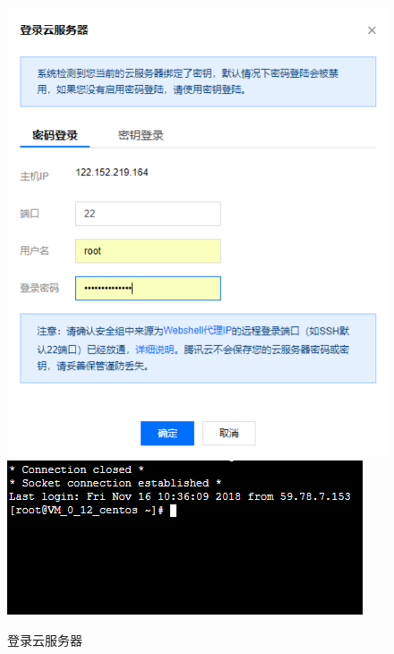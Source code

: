 \documentclass[a4paper,11pt]{ctexart}
\begin{document}
\begin{spacing}{1.5}
\begin{figure}[h]
	\includegraphics[scale=0.35]{登录1.png}
	\includegraphics[scale=0.9]{登录.png}
	\caption{登录云服务器}\label{figure:登录1}
\end{figure}

\end{spacing}
\end{document}
